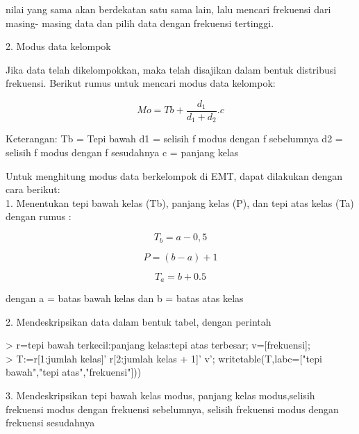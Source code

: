 \documentclass[a4paper,10pt]{article}
\begin{document}
\begin{eulernotebook}
\begin{eulerttcomment}
   nilai yang sama akan berdekatan satu sama
   lain, lalu mencari frekuensi dari masing-
   masing data dan pilih data dengan frekuensi
   tertinggi.
\end{eulerttcomment}
\begin{eulercomment}
2. Modus data kelompok\\
\end{eulercomment}
\begin{eulerttcomment}
   Jika data telah dikelompokkan, maka telah
   disajikan dalam bentuk distribusi frekuensi.
   Berikut rumus untuk mencari modus data
   kelompok:
\end{eulerttcomment}
\begin{eulerformula}
\[
Mo = Tb+\frac{d_1}{d_1+d_2}.{c}
\]
\end{eulerformula}
\begin{eulerttcomment}
   Keterangan:
     Tb = Tepi bawah
     d1 = selisih f modus dengan f sebelumnya
     d2 = selisih f modus dengan f sesudahnya
      c = panjang kelas
\end{eulerttcomment}
\begin{eulercomment}
Untuk menghitung modus data berkelompok di EMT, dapat dilakukan dengan
cara berikut:\\
1. Menentukan tepi bawah kelas (Tb), panjang kelas (P), dan tepi atas
kelas (Ta) dengan rumus :

\end{eulercomment}
\begin{eulerformula}
\[
T_b=a-0,5
\]
\end{eulerformula}
\begin{eulerformula}
\[
P=(b-a)+1
\]
\end{eulerformula}
\begin{eulerformula}
\[
T_a=b+0.5
\]
\end{eulerformula}
\begin{eulercomment}
dengan a = batas bawah kelas dan b = batas atas kelas

2. Mendeskripsikan data dalam bentuk tabel, dengan perintah

\textgreater{} r=tepi bawah terkecil:panjang kelas:tepi atas terbesar;
v=[frekuensi];\\
\textgreater{} T:=r[1:jumlah kelas]' \textbar{} r[2:jumlah kelas + 1]' \textbar{} v';
writetable(T,labc=["tepi bawah","tepi atas","frekuensi"]))

3. Mendeskripsikan tepi bawah kelas modus, panjang kelas modus,selisih
frekuensi modus dengan frekuensi sebelumnya, selisih frekuensi modus
dengan frekuensi sesudahnya


\end{eulercomment}
\end{eulernotebook}
\end{document}
